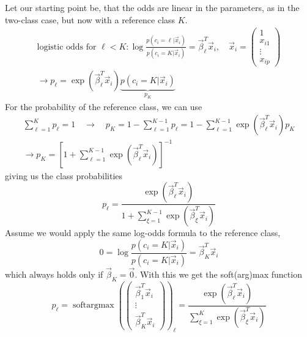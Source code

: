 Let our starting point be, that the odds are linear in the parameters,
as in the two-class case, but now with a reference class $K$.
\begin{equation}
    \begin{gathered}
        \text{logistic odds for } \ell<K: \log \frac{p(c_i = \ell | \vec{x}_i)}{p(c_i = K | \vec{x}_i)} = \vec{\beta}_\ell^T \vec{x}_i, \quad \vec{x}_i = \begin{pmatrix}
            1 \\ x_{i1} \\ \vdots \\ x_{ip}
        \end{pmatrix} \\
        \rightarrow p_\ell = \exp(\vec{\beta}_\ell^T \vec{x}_i) \underbrace{p(c_i = K | \vec{x}_i)}_{p_K}
    \end{gathered}
\end{equation}
For the probability of the reference class, we can use
\begin{equation}
    \begin{gathered}
    \sum_{\ell=1}^{K} p_\ell = 1 \quad \rightarrow \quad p_K = 1 - \sum_{\ell=1}^{K-1} p_\ell = 1 - \sum_{\ell=1}^{K-1} \exp(\vec{\beta}_\ell^T \vec{x}_i) p_K \\
    \rightarrow p_K = \left[ 1 + \sum_{\ell=1}^{K-1} \exp(\vec{\beta}_\ell^T \vec{x}_i) \right]^{-1}
    \end{gathered}
\end{equation}
giving us the class probabilities
\begin{equation}
    p_\ell = \frac{\exp(\vec{\beta}_\ell^T \vec{x}_i)}{1 + \sum_{\xi=1}^{K-1} \exp(\vec{\beta}_\xi^T \vec{x}_i)}
\end{equation}
Assume we would apply the same log-odds formula to the reference class,
\begin{equation}
    0 = \log \frac{p(c_i = K | \vec{x}_i)}{p(c_i = K | \vec{x}_i)} = \vec{\beta}_K^T \vec{x}_i
\end{equation}
which always holds only if $\vec{\beta}_K = \vec{0}$. With this we get the
soft(arg)max function
\begin{equation}
    p_\ell = \operatorname{softargmax}\left( \begin{pmatrix}
        \vec{\beta}_1^T \vec{x}_i \\ \vdots \\ \vec{\beta}_{K}^T \vec{x}_i
    \end{pmatrix} \right)_\ell = \frac{\exp(\vec{\beta}_\ell^T \vec{x}_i)}{\sum_{\xi=1}^{K} \exp(\vec{\beta}_\xi^T \vec{x}_i)}
\end{equation}

